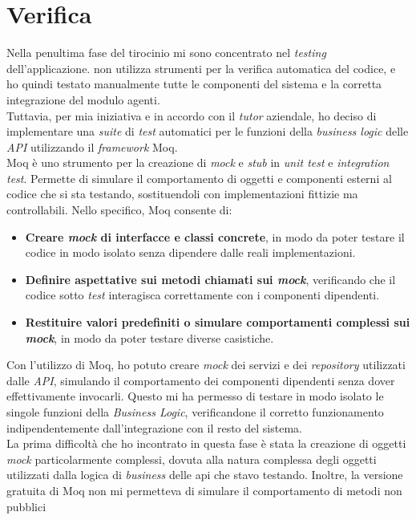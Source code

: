 \section{Verifica}
Nella penultima fase del tirocinio mi sono concentrato nel \textit{testing} dell'applicazione. {\company} non utilizza 
strumenti per la verifica automatica del codice, e ho quindi testato manualmente tutte le componenti del sistema e la 
corretta integrazione del modulo agenti.\\
Tuttavia, per mia iniziativa e in accordo con il \textit{tutor} aziendale, ho deciso di implementare una \textit{suite} di 
\textit{test} automatici per le funzioni della \textit{business logic} delle \textit{API} utilizzando il \textit{framework} 
Moq.\\
Moq è uno strumento per la creazione di \textit{mock} e \textit{stub} in \textit{unit test} 
e \textit{integration test}. Permette di simulare il comportamento di oggetti e componenti esterni al codice che si sta 
testando, sostituendoli con implementazioni fittizie ma controllabili. Nello specifico, Moq consente di:
\begin{itemize}
    \item \textbf{Creare \textit{mock} di interfacce e classi concrete}, in modo da poter testare il codice in modo isolato 
          senza dipendere dalle reali implementazioni.
    \item \textbf{Definire aspettative sui metodi chiamati sui \textit{mock}}, verificando che il codice sotto \textit{test} 
          interagisca correttamente con i componenti dipendenti.
    \item \textbf{Restituire valori predefiniti o simulare comportamenti complessi sui \textit{mock}}, in modo da poter testare 
          diverse casistiche.
\end{itemize}
Con l'utilizzo di Moq, ho potuto creare \textit{mock} dei servizi e dei \textit{repository} utilizzati dalle \textit{API}, 
simulando il comportamento dei componenti dipendenti senza dover effettivamente invocarli. Questo mi ha permesso di testare 
in modo isolato le singole funzioni della \textit{Business Logic}, verificandone il corretto funzionamento indipendentemente 
dall'integrazione con il resto del sistema.\\
La prima difficoltà che ho incontrato in questa fase è stata la creazione di oggetti \textit{mock} particolarmente 
complessi, dovuta alla natura complessa degli oggetti utilizzati dalla logica di \textit{business} delle \gls{api} che 
stavo testando. Inoltre, la versione gratuita di Moq non mi permetteva di simulare il comportamento di metodi non pubblici 
